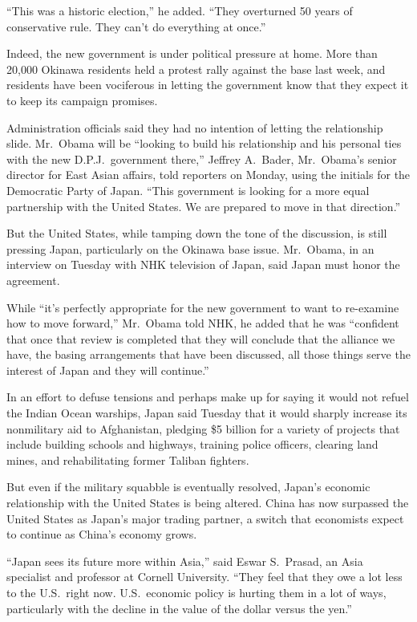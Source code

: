 ﻿\documentclass[12pt]{article}
\begin{document}
``This was a historic election,'' he added. ``They overturned 50 years of conservative rule. They
can't do everything at once.''

Indeed, the new government is under political pressure at home. More than 20,000 Okinawa residents
held a protest rally against the base last week, and residents have been vociferous in letting the
government know that they expect it to keep its campaign promises.

Administration officials said they had no intention of letting the relationship slide. Mr.~Obama
will be ``looking to build his relationship and his personal ties with the new D.P.J.~government
there,'' Jeffrey A.~Bader, Mr.~Obama's senior director for East Asian affairs, told reporters on
Monday, using the initials for the Democratic Party of Japan. ``This government is looking for a
more equal partnership with the United States. We are prepared to move in that direction.''

But the United States, while tamping down the tone of the discussion, is still pressing Japan,
particularly on the Okinawa base issue. Mr.~Obama, in an interview on Tuesday with NHK television of
Japan, said Japan must honor the agreement.

While ``it's perfectly appropriate for the new government to want to re-examine how to move
forward,'' Mr.~Obama told NHK, he added that he was ``confident that once that review is completed
that they will conclude that the alliance we have, the basing arrangements that have been discussed,
all those things serve the interest of Japan and they will continue.''

In an effort to defuse tensions and perhaps make up for saying it would not refuel the Indian Ocean
warships, Japan said Tuesday that it would sharply increase its nonmilitary aid to Afghanistan,
pledging \$5 billion for a variety of projects that include building schools and highways, training
police officers, clearing land mines, and rehabilitating former Taliban fighters.

But even if the military squabble is eventually resolved, Japan's economic relationship with the
United States is being altered. China has now surpassed the United States as Japan's major trading
partner, a switch that economists expect to continue as China's economy grows.

``Japan sees its future more within Asia,'' said Eswar S.~Prasad, an Asia specialist and professor
at Cornell University. ``They feel that they owe a lot less to the U.S.~right now. U.S.~economic
policy is hurting them in a lot of ways, particularly with the decline in the value of the dollar
versus the yen.''
\end{document}
